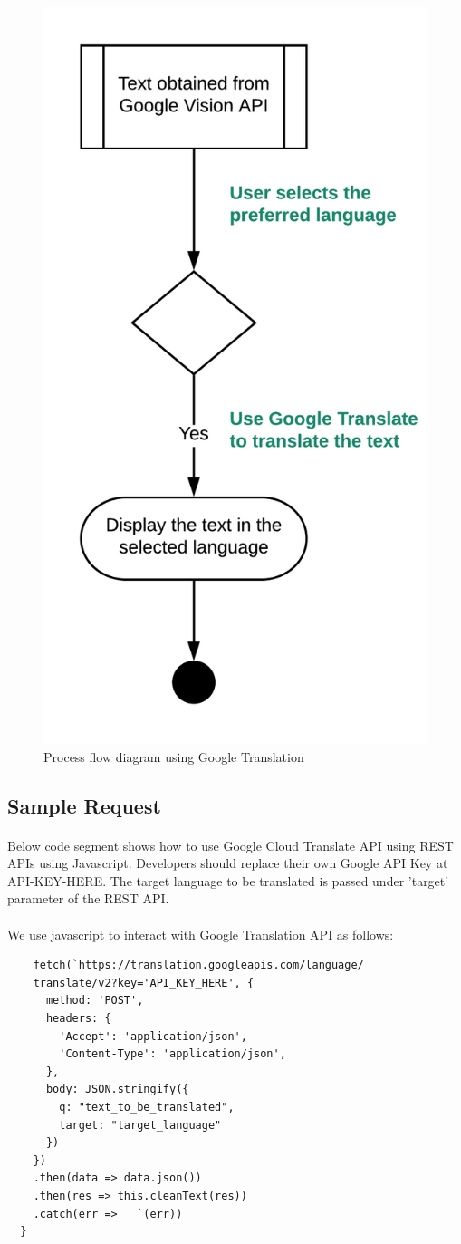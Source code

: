 \documentclass[12pt]{article}
\begin{document}
\begin{figure}[H]
	\centering
	\includegraphics[width=0.5\linewidth]{media/Translate.png}
	\caption{Process flow diagram using Google Translation}
	\label{fig:translate_uml}
\end{figure} 

\subsection{Sample Request}

\paragraph{}Below code segment shows how to use Google Cloud Translate API using REST APIs using Javascript. Developers should replace their own Google API Key at  API-KEY-HERE. The target language to be translated is passed under 'target' parameter of the REST API. 

\paragraph{}We use javascript to interact with Google Translation API as follows:

\begin{lstlisting}
    fetch(`https://translation.googleapis.com/language/
    translate/v2?key='API_KEY_HERE', {
      method: 'POST',
      headers: {
        'Accept': 'application/json',
        'Content-Type': 'application/json',
      },
      body: JSON.stringify({
        q: "text_to_be_translated",
        target: "target_language"
      })
    })
    .then(data => data.json())
    .then(res => this.cleanText(res))
    .catch(err => 	`(err))
  }
\end{lstlisting}
\end{document}
